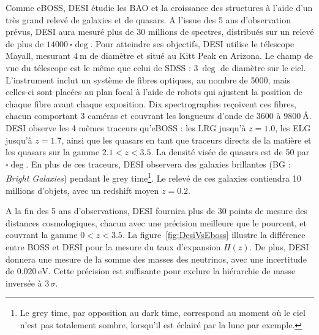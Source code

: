 Comme eBOSS, DESI étudie les BAO et la croissance des structures à l'aide d'un très grand relevé de galaxies et de quasars. A l'issue des 5 ans d'observation prévus, DESI aura mesuré plus de 30 millions de spectres, distribués sur un relevé de plus de $\SI{14000}{\square\deg}$.
Pour atteindre ses objectifs, DESI utilise le télescope Mayall, mesurant $\SI{4}{\meter}$ de diamètre et situé au Kitt Peak en Arizona. Le champ de vue du télescope est le même que celui de SDSS : $\SI{3}{\deg}$ de diamètre sur le ciel. L'instrument inclut un système de fibres optiques, au nombre de \num{5000}, mais celles-ci sont placées au plan focal à l'aide de robots qui ajustent la position de chaque fibre avant chaque exposition. Dix spectrographes reçoivent ces fibres, chacun comportant 3 caméras et couvrant les longueurs d'onde de \num{3600} à $\SI{9800}{\angstrom}$.
‌‌DESI observe les 4 mêmes traceurs qu'eBOSS : les LRG jusqu'à $z=\num{1,0}$, les ELG jusqu'à $z=\num{1,7}$, ainsi que les quasars en tant que traceurs directs de la matière et les quasars \lya{} sur la gamme $\num{2,1} < z < \num{3,5}$. La densité visée de quasars \lya{} est de \num{50} par $\si{\square\deg}$.
En plus de ces traceurs, DESI observera des galaxies brillantes (BG : \emph{Bright Galaxies}) pendant le grey time\footnote{Le grey time, par opposition au dark time, correspond au moment où le ciel n'est pas totalement sombre, lorsqu'il est éclairé par la lune par exemple.}. Le relevé de ces galaxies contiendra 10 millions d'objets, avec un redshift moyen $z=\num{0,2}$.

A la fin des 5 ans d'observations, DESI fournira plus de 30 points de mesure des distances cosmologiques, chacun avec une précision meilleure que le pourcent, et couvrant la gamme $\num{0}< z < \num{3.5}$. La figure~\ref{fig:DesiVsEboss} illustre la différence entre BOSS et DESI pour la mesure du taux d'expansion $H(z)$.
De plus, DESI donnera une mesure de la somme des masses des neutrinos, avec une incertitude de $\num{0,020}\,\mathrm{eV}$. Cette précision est suffisante pour exclure la hiérarchie de masse inversée à $3\,\sigma$.


